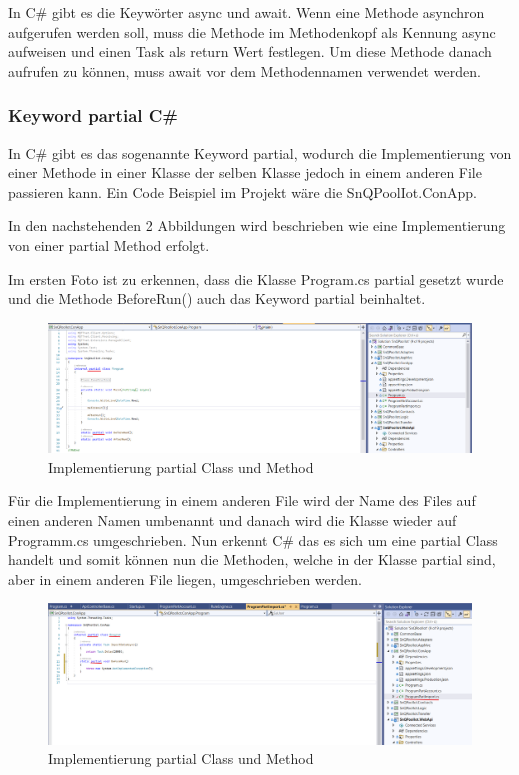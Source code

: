 In C\# gibt es die Keywörter async und await. Wenn eine Methode asynchron aufgerufen werden soll, muss die Methode im Methodenkopf als Kennung async aufweisen und einen Task als return Wert festlegen.
Um diese Methode danach aufrufen zu können, muss await vor dem Methodennamen verwendet werden.
\cite{Async}

\subsubsection*{Keyword partial C\#}
In C\# gibt es das sogenannte Keyword partial, wodurch die Implementierung von einer Methode in einer Klasse der selben Klasse jedoch in einem anderen File passieren kann.
Ein Code Beispiel im Projekt wäre die SnQPoolIot.ConApp.

In den nachstehenden 2 Abbildungen wird beschrieben wie eine Implementierung von einer partial Method erfolgt.

Im ersten Foto ist zu erkennen, dass die Klasse Program.cs partial gesetzt wurde und die Methode BeforeRun() auch das Keyword partial beinhaltet.
\begin{figure}[H]
    \centering
    \includegraphics[width=1\textwidth]{./pics/PartialKeyword1.png}
    \caption{Implementierung partial Class und Method}
\end{figure}

Für die Implementierung in einem anderen File wird der Name des Files auf einen anderen Namen umbenannt und danach wird die Klasse wieder auf Programm.cs umgeschrieben.
Nun erkennt C\# das es sich um eine partial Class handelt und somit können nun die Methoden, welche in der Klasse partial sind, aber in einem anderen File liegen, umgeschrieben werden. 
\begin{figure}[H]
    \centering
    \includegraphics[width=1\textwidth]{./pics/PartialKeyword2.png}
    \caption{Implementierung partial Class und Method}
\end{figure}
\cite{KeywordPartial}

